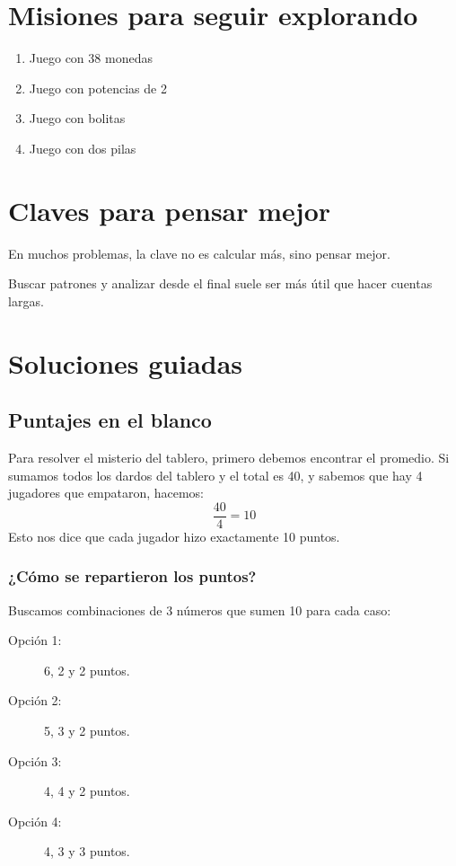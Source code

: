 \documentclass[12pt]{article}
\newcommand{\observa}[1]{%
    \begin{tcolorbox}[colback=amarilloSuave, colframe=naranjaEureka, title=Observa y piensa]
    #1
    \end{tcolorbox}
}
\begin{document}
    \newpage
    \section{Misiones para seguir explorando}
    \begin{desafio}
        \begin{enumerate}
            \item Juego con 38 monedas
            \item Juego con potencias de 2
            \item Juego con bolitas
            \item Juego con dos pilas
        \end{enumerate}
    \end{desafio}

    \section{Claves para pensar mejor}
    \begin{idea}
        En muchos problemas, la clave no es calcular más, sino pensar mejor.
    \end{idea}

    \observa{Buscar patrones y analizar desde el final suele ser más útil que hacer cuentas largas.}

    \section{Soluciones guiadas}

    \subsection{Puntajes en el blanco}
    Para resolver el misterio del tablero, primero debemos encontrar el promedio. Si sumamos todos los dardos del tablero y el total es 40, y sabemos que hay 4 jugadores que empataron, hacemos:
    \[
    \frac{40}{4} = 10
    \]
    Esto nos dice que cada jugador hizo exactamente 10 puntos.

    \subsubsection*{¿Cómo se repartieron los puntos?}
    Buscamos combinaciones de 3 números que sumen 10 para cada caso:

    \begin{description}
        \item[Opción 1:] 6, 2 y 2 puntos.
        \item[Opción 2:] 5, 3 y 2 puntos.
        \item[Opción 3:] 4, 4 y 2 puntos.
        \item[Opción 4:] 4, 3 y 3 puntos.
    \end{description}
\end{document}
